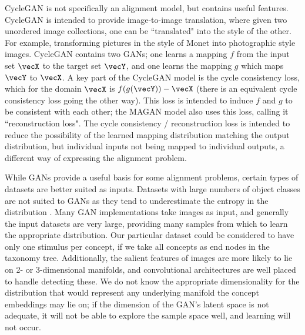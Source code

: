 CycleGAN \cite{CycleGAN} is not specifically an alignment model, but contains useful features. CycleGAN is intended to provide image-to-image translation, where given two unordered image collections, one can be ``translated" into the style of the other. For example, transforming pictures in the style of Monet into photographic style images. CycleGAN contains two GANs; one learns a mapping $f$ from the input set $\vecX$ to the target set $\vecY$, and one learns the mapping $g$ which maps $\vecY$ to $\vecX$. A key part of the CycleGAN model is the cycle consistency loss, which for the domain $\vecX$ is $f(g(\vecY)) - \vecX$ (there is an equivalent cycle consistency loss going the other way). This loss is intended to induce $f$ and $g$ to be consistent with each other; the MAGAN model also uses this loss, calling it ``reconstruction loss". The cycle consistency / reconstruction loss is intended to reduce the possibility of the learned mapping distribution matching the output distribution, but individual inputs not being mapped to individual outputs, a different way of expressing the alignment problem. 

While GANs provide a useful basis for some alignment problems, certain types of datasets are better suited as inputs. Datasets with large numbers of object classes are not suited to GANs as they tend to underestimate the entropy in the distribution \cite{ImprovedTechniquesTrainingGANS}. Many GAN implementations take images as input, and generally the input datasets are very large, providing many samples from which to learn the appropriate distribution. Our particular dataset could be considered to have only one stimulus per concept, if we take all concepts as end nodes in the taxonomy tree.  Additionally, the salient features of images are more likely to lie on 2- or 3-dimensional manifolds, and convolutional architectures are well placed to handle detecting these. We do not know the appropriate dimensionality for the distribution that would represent any underlying manifold the concept embeddings may lie on; if the dimension of the GAN's latent space is not adequate, it will not be able to explore the sample space well, and learning will not occur. 

